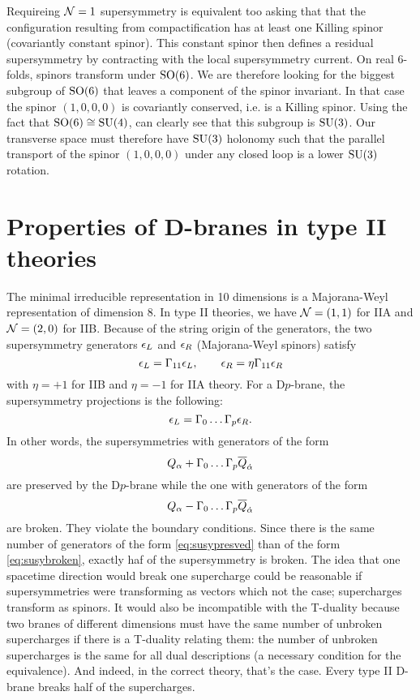 \documentclass[a4paper,10pt]{article}
\begin{document}
    Requireing $\mathcal{N}=1$ supersymmetry is equivalent too asking that that the configuration resulting from compactification has at least one Killing spinor (covariantly constant spinor). This constant spinor then defines a residual supersymmetry by contracting with the local supersymmetry current. On real $6$-folds, spinors transform under $\text{SO}(6)$. We are therefore looking for the biggest subgroup of $\text{SO}(6)$ that leaves a component of the spinor invariant. In that case the spinor $(1,0,0,0)$ is covariantly conserved, i.e. is a Killing spinor. Using the fact that $\text{SO}(6)\cong\text{SU}(4)$, can clearly see that this subgroup is $\text{SU}(3)$. Our transverse space must therefore have $\text{SU}(3)$ holonomy such that the parallel transport of the spinor $(1,0,0,0)$ under any closed loop is a lower $\text{SU}(3)$ rotation.

\section{Properties of D-branes in type II theories}

    The minimal irreducible representation in 10 dimensions is a Majorana-Weyl representation of dimension 8. In type II theories, we have $\mathcal{N}=(1,1)$ for IIA and $\mathcal{N}=(2,0)$ for IIB. Because of the string origin of the generators, the two supersymmetry generators $\epsilon_L$ and $\epsilon_R$ (Majorana-Weyl spinors) satisfy
    \begin{equation}
        \epsilon_L=\Gamma_{11}\epsilon_L,\qquad \epsilon_R=\eta\Gamma_{11}\epsilon_R
    \end{equation}
    with $\eta=+1$ for IIB and $\eta=-1$ for IIA theory. For a D$p$-brane, the supersymmetry projections is the following:
    \begin{equation}
        \epsilon_L=\Gamma_0\dots\Gamma_p\epsilon_R.
    \end{equation}
    In other words, the supersymmetries with generators of the form
    \begin{equation}
        Q_\alpha+\Gamma_0\dots\Gamma_p\overline{Q}_{\dot{\alpha}}\label{eq:susypresved}
    \end{equation}
    are preserved by the D$p$-brane while the one with generators of the form
    \begin{equation}
        Q_\alpha-\Gamma_0\dots\Gamma_p\overline{Q}_{\dot{\alpha}}\label{eq:susybroken}
    \end{equation}
    are broken. They violate the boundary conditions. Since there is the same number of generators of the form \eqref{eq:susypresved} than of the form \eqref{eq:susybroken}, exactly haf of the supersymmetry is broken. The idea that one spacetime direction would break one supercharge could be reasonable if supersymmetries were transforming as vectors which not the case; supercharges transform as spinors. It would also be incompatible with the T-duality because two branes of different dimensions must have the same number of unbroken supercharges if there is a T-duality relating them: the number of unbroken supercharges is the same for all dual descriptions (a necessary condition for the equivalence). And indeed, in the correct theory, that's the case. Every type II D-brane breaks half of the supercharges.
\end{document}

